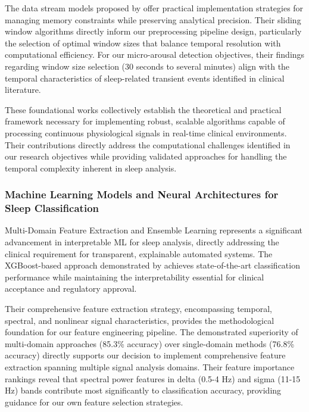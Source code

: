 \documentclass[a4paper,12pt,twoside]{article}
\begin{document}
The data stream models proposed by \citeauthor{babcock2002models} \cite{babcock2002models} offer practical implementation strategies for managing memory constraints while preserving analytical precision. Their sliding window algorithms directly inform our preprocessing pipeline design, particularly the selection of optimal window sizes that balance temporal resolution with computational efficiency. For our micro-arousal detection objectives, their findings regarding window size selection (30 seconds to several minutes) align with the temporal characteristics of sleep-related transient events identified in clinical literature.

These foundational works collectively establish the theoretical and practical framework necessary for implementing robust, scalable algorithms capable of processing continuous physiological signals in real-time clinical environments. Their contributions directly address the computational challenges identified in our research objectives while providing validated approaches for handling the temporal complexity inherent in sleep analysis.

\subsubsection{Machine Learning Models and Neural Architectures for Sleep Classification}

Multi-Domain Feature Extraction and Ensemble Learning \cite{Wang2025} represents a significant advancement in interpretable ML for sleep analysis, directly addressing the clinical requirement for transparent, explainable automated systems. The XGBoost-based approach demonstrated by \citeauthor{Wang2025} achieves state-of-the-art classification performance while maintaining the interpretability essential for clinical acceptance and regulatory approval.

Their comprehensive feature extraction strategy, encompassing temporal, spectral, and nonlinear signal characteristics, provides the methodological foundation for our feature engineering pipeline. The demonstrated superiority of multi-domain approaches (85.3\% accuracy) over single-domain methods (76.8\% accuracy) directly supports our decision to implement comprehensive feature extraction spanning multiple signal analysis domains. Their feature importance rankings reveal that spectral power features in delta (0.5-4 Hz) and sigma (11-15 Hz) bands contribute most significantly to classification accuracy, providing guidance for our own feature selection strategies.
\end{document}
